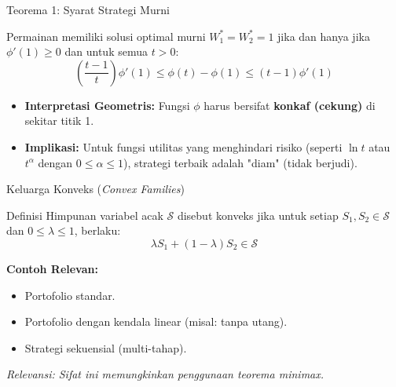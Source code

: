 \documentclass{beamer}
\begin{document}
\begin{frame}{Teorema 1: Syarat Strategi Murni}
    \begin{theorem}
        Permainan memiliki solusi optimal murni $W_{1}^{*} = W_{2}^{*} = 1$ jika dan hanya jika $\phi'(1) \ge 0$ dan untuk semua $t > 0$:
        $$\left(\frac{t-1}{t}\right)\phi'(1) \le \phi(t)-\phi(1) \le (t-1)\phi'(1)$$
    \end{theorem}
    
    \begin{itemize}
        \item \textbf{Interpretasi Geometris:} Fungsi $\phi$ harus bersifat \textbf{konkaf (cekung)} di sekitar titik 1.
        \item \textbf{Implikasi:} Untuk fungsi utilitas yang menghindari risiko (seperti $\ln t$ atau $t^\alpha$ dengan $0 \le \alpha \le 1$), strategi terbaik adalah "diam" (tidak berjudi).
    \end{itemize}
\end{frame}

\begin{frame}{Keluarga Konveks (\textit{Convex Families})}
    \begin{block}{Definisi}
        Himpunan variabel acak $\mathcal{S}$ disebut konveks jika untuk setiap $S_1, S_2 \in \mathcal{S}$ dan $0 \le \lambda \le 1$, berlaku:
        $$\lambda S_1 + (1-\lambda)S_2 \in \mathcal{S}$$
    \end{block}
    
    \textbf{Contoh Relevan:}
    \begin{itemize}
        \item Portofolio standar.
        \item Portofolio dengan kendala linear (misal: tanpa utang).
        \item Strategi sekuensial (multi-tahap).
    \end{itemize}
    
    \textit{Relevansi: Sifat ini memungkinkan penggunaan teorema minimax.}
\end{frame}
\end{document}
